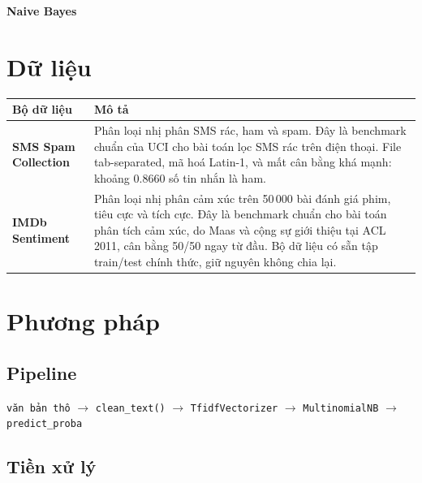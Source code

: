 \documentclass[11pt,a4paper]{article}
\newcommand{\task}[1]{\textcolor{hdr}{\textbf{#1}}}
\newcommand{\code}[1]{\texttt{#1}}
\begin{document}
\begin{center}
{\sffamily\huge\bfseries\color{hdr} Naive Bayes}\\[0.6em]
\end{center}
\vspace{0.3em}




\section{Dữ liệu}


\begin{longtable}{@{}p{}p{}@{}}
\toprule
\textbf{Bộ dữ liệu} & \textbf{Mô tả} \\
\midrule
\endhead
\task{SMS Spam Collection} &
Phân loại nhị phân SMS rác, ham và spam. Đây là benchmark chuẩn của UCI cho bài toán lọc SMS rác trên điện thoại. File tab-separated, mã hoá Latin-1, và mất cân bằng khá mạnh: khoảng 0.8660 số tin nhắn là ham. \\
\addlinespace
\task{IMDb Sentiment} &
Phân loại nhị phân cảm xúc trên 50\,000 bài đánh giá phim, tiêu cực và tích cực. Đây là benchmark chuẩn cho bài toán phân tích cảm xúc, do Maas và cộng sự giới thiệu tại ACL 2011, cân bằng 50/50 ngay từ đầu. Bộ dữ liệu có sẵn tập train/test chính thức, giữ nguyên không chia lại. \\
\bottomrule
\end{longtable}
\addtocounter{table}{-1}


\section{Phương pháp}

\subsection{Pipeline}

\begin{center}
\footnotesize
\code{văn bản thô} $\longrightarrow$ \code{clean\_text()} $\longrightarrow$
\code{TfidfVectorizer} $\longrightarrow$ \code{MultinomialNB}
$\longrightarrow$ \code{predict\_proba}
\end{center}

\subsection{Tiền xử lý}
\end{document}
